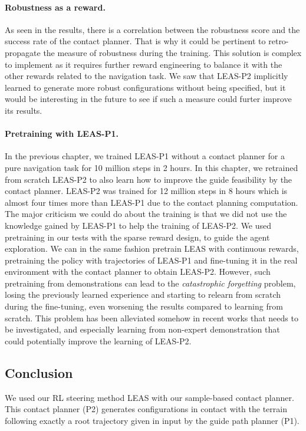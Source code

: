 \paragraph{Robustness as a reward.} 
As seen in the results, there is a correlation between the robustness score and the success rate of the contact planner. 
That is why it could be pertinent to retro-propagate the measure of robustness during the training.
This solution is complex to implement as it requires further reward engineering to balance it with the other rewards related to the navigation task. 
We saw that LEAS-P2 implicitly learned to generate more robust configurations without being specified, but it would be interesting in the future to see if such a measure could furter improve its results.

\paragraph{Pretraining with LEAS-P1.} 
In the previous chapter, we trained LEAS-P1 without a contact planner for a pure navigation task for 10 million steps in 2 hours. 
In this chapter, we retrained from scratch LEAS-P2 to also learn how to improve the guide feasibility by the contact planner. LEAS-P2 was trained for 12 million steps in 8 hours which is almost four times more than LEAS-P1 due to the contact planning computation. 
The major criticism we could do about the training is that we did not use the knowledge gained by LEAS-P1 to help the training of LEAS-P2.
We used pretraining in our tests with the sparse reward design, to guide the agent exploration.
We can in the same fashion pretrain LEAS with continuous rewards, pretraining the policy with trajectories of LEAS-P1 and fine-tuning it in the real environment with the contact planner to obtain LEAS-P2.
However, such pretraining from demonstrations can lead to the \textit{catastrophic forgetting} problem, losing the previously learned experience and starting to relearn from scratch during the fine-tuning, even worsening the results compared to learning from scratch.
This problem has been alleviated somehow in recent works \cite{DDPGfd,pretraining_BC} that needs to be investigated, and especially learning from non-expert demonstration \cite{learning_from_non_expert, meta_learning_from_demo} that could potentially improve the learning of LEAS-P2.

\subsection{Conclusion}
We used our RL steering method LEAS with our sample-based contact planner.
This contact planner (P2) generates configurations in contact with the terrain following exactly a root trajectory given in input by the guide path planner (P1).


